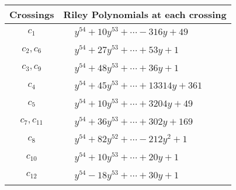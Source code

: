 \documentclass[1p]{elsarticle_modified}
\theoremstyle{definition}
\begin{document}
\begin{tabular}{m{50pt}|m{274pt}}
Crossings & \hspace{64pt}Riley Polynomials at each crossing \\
\hline $$\begin{aligned}c_{1}\end{aligned}$$&$\begin{aligned}
&y^{54}+10 y^{53}+\cdots-316 y+49
\end{aligned}$\\
\hline $$\begin{aligned}c_{2},c_{6}\end{aligned}$$&$\begin{aligned}
&y^{54}+27 y^{53}+\cdots+53 y+1
\end{aligned}$\\
\hline $$\begin{aligned}c_{3},c_{9}\end{aligned}$$&$\begin{aligned}
&y^{54}+48 y^{53}+\cdots+36 y+1
\end{aligned}$\\
\hline $$\begin{aligned}c_{4}\end{aligned}$$&$\begin{aligned}
&y^{54}+45 y^{53}+\cdots+13314 y+361
\end{aligned}$\\
\hline $$\begin{aligned}c_{5}\end{aligned}$$&$\begin{aligned}
&y^{54}+10 y^{53}+\cdots+3204 y+49
\end{aligned}$\\
\hline $$\begin{aligned}c_{7},c_{11}\end{aligned}$$&$\begin{aligned}
&y^{54}+36 y^{53}+\cdots+302 y+169
\end{aligned}$\\
\hline $$\begin{aligned}c_{8}\end{aligned}$$&$\begin{aligned}
&y^{54}+82 y^{52}+\cdots-212 y^2+1
\end{aligned}$\\
\hline $$\begin{aligned}c_{10}\end{aligned}$$&$\begin{aligned}
&y^{54}+10 y^{53}+\cdots+20 y+1
\end{aligned}$\\
\hline $$\begin{aligned}c_{12}\end{aligned}$$&$\begin{aligned}
&y^{54}-18 y^{53}+\cdots+30 y+1
\end{aligned}$\\
\hline
\end{tabular}\\~\\
\end{document}
